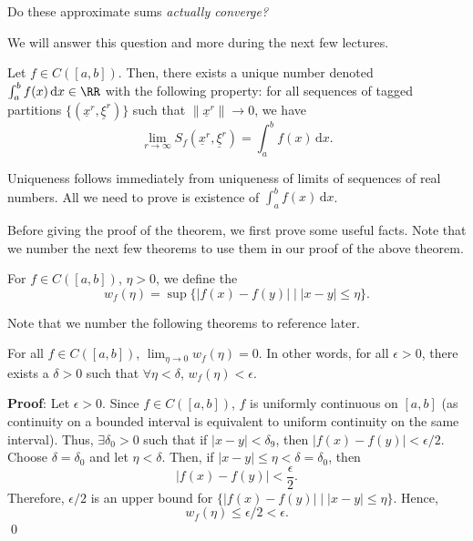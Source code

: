 \begin{question}
Do these approximate sums \textit{actually converge?}
\end{question}

We will answer this question and more during the next few lectures.


\begin{theorem}
Let $f\in C([a,b])$. Then, there exists a unique number denoted $\int_a^b f(x)\,\mathrm dx\in \RR$ with the following property: for all sequences of tagged partitions $\{(\underline{x}^r, \underline{\xi}^r)\}$ such that $\lVert \underline{x}^r\rVert \to 0$, we have 
\[
\lim_{r \to \infty} S_f(\underline{x}^r, \underline{\xi}^r) = \int_a^b f(x) \,\mathrm dx.
\]
\end{theorem}
\begin{remark}
Uniqueness follows immediately from uniqueness of limits of sequences of real numbers. All we need to prove is existence of $\int_a^b f(x) \,\mathrm dx$.
\end{remark}

Before giving the proof of the theorem, we first prove some useful facts. Note that we number the next few theorems to use them in our proof of the above theorem.

\begin{definition}
For $f\in C([a,b])$, $\eta >0$, we define the 
\[
w_f(\eta) = \sup \{|f(x) - f(y)| \mid |x-y| \leq \eta\}.
\]
\end{definition}

\begin{remark}
Note that we number the following theorems to reference later.
\end{remark}

\begin{theorem}[Theorem I]
For all $f\in C([a,b])$, $\lim_{\eta\to 0} w_f(\eta) = 0$. In other words, for all $\epsilon>0$, there exists a $\delta>0$ such that $\forall \eta < \delta$, $w_f(\eta) < \epsilon$.
\end{theorem}
\textbf{Proof}: Let $\epsilon>0$. Since $f\in C([a,b])$, $f$ is uniformly continuous on $[a,b]$ (as continuity on a bounded interval is equivalent to uniform continuity on the same interval). Thus, $\exists \delta_0 >0$ such that if $|x-y| < \delta_9$, then $|f(x)-f(y)|<\epsilon/2$. Choose $\delta = \delta_0$ and let $\eta < \delta$. Then, if $|x-y|\leq \eta < \delta = \delta_0$, then 
\[
|f(x) - f(y)|< \frac{\epsilon}{2}.
\]
Therefore, $\epsilon/2$ is an upper bound for $\{|f(x) - f(y)| \mid |x-y|\leq \eta\}$. Hence, 
\[
w_f (\eta) \leq \epsilon/2 < \epsilon.
\] \qed 

